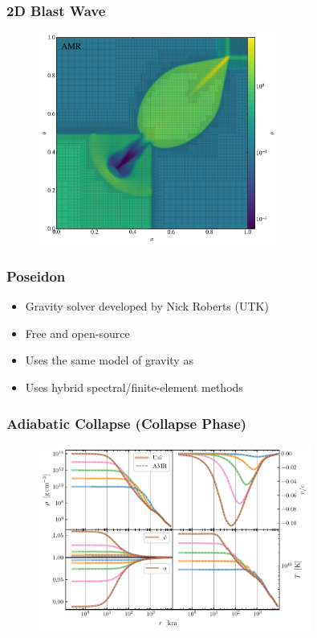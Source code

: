 \documentclass{beamer}
\begin{document}
\begin{frame}
\frametitle{2D Blast Wave}

  \begin{figure}[htb!]
    \centering
    \includegraphics[width=0.7\textwidth]{fig.dZB2002_032x032_AMR_Mesh.pdf}
  \end{figure}

\end{frame}

\begin{frame}
\frametitle{Poseidon}

  \begin{itemize}
    \item
      Gravity solver developed by Nick Roberts (UTK)
    \item
      Free and open-source
    \item
      Uses the same model of gravity as \thornado
    \item
      Uses hybrid spectral/finite-element methods
  \end{itemize}

\end{frame}

\begin{frame}
\frametitle{Adiabatic Collapse (Collapse Phase)}

  \begin{figure}[htb!]
    \centering
    \includegraphics[width=0.8\textwidth]{fig.collapse.pdf}
  \end{figure}

\end{frame}
\end{document}
